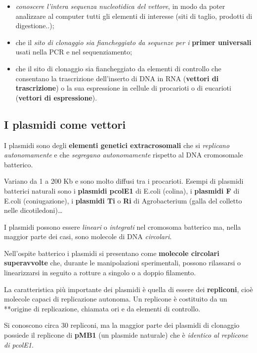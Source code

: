 \documentclass[11pt]{book}
\begin{document}
\begin{itemize}
\itemsep1pt\parskip0pt
\item
  \emph{conoscere l'intera sequenza nucleotidica del vettore}, in modo
  da poter analizzare al computer tutti gli elementi di interesse (siti
  di taglio, prodotti di digestione..);
\item
  che il \emph{sito di clonaggio sia fiancheggiato da sequenze per i}
  \textbf{primer universali} usati nella PCR e nel sequenziamento;
\item
  che il sito di clonaggio sia fiancheggiato da elementi di controllo
  che consentano la trascrizione dell'inserto di DNA in RNA
  (\textbf{vettori di trascrizione}) o la sua espressione in cellule di
  procarioti o di eucarioti (\textbf{vettori di espressione}).
\end{itemize}

\subsection{I plasmidi come vettori}\label{i-plasmidi-come-vettori}

I plasmidi sono degli \textbf{elementi genetici extracrosomali} che si
\emph{replicano autonomamente} e che \emph{segregano autonomamente}
rispetto al DNA cromosomale batterico.

Variano da 1 a 200 Kb e sono molto diffusi tra i procarioti. Esempi di
plasmidi batterici naturali sono i \textbf{plasmidi pcolE1} di E.coli
(colina), i \textbf{plasmidi F} di E.coli (coniugazione), i
\textbf{plasmidi Ti} o \textbf{Ri} di Agrobacterium (galla del colletto
nelle dicotiledoni)\ldots{}

I plasmidi possono essere \emph{lineari} o \emph{integrati} nel
cromosoma batterico ma, nella maggior parte dei casi, sono molecole di
DNA \emph{circolari}.

Nell'ospite batterico i plasmidi si presentano come \textbf{molecole
circolari superavvolte} che, durante le manipolazioni sperimentali,
possono rilassarsi o linearizzarsi in seguito a rotture a singolo o a
doppio filamento.

La caratteristica più importante dei plasmidi è quella di essere dei
\textbf{repliconi}, cioè molecole capaci di replicazione autonoma. Un
replicone è costituito da un **origine di replicazione, chiamata ori e
da elementi di controllo.

Si conoscono circa 30 repliconi, ma la maggior parte dei plasmidi di
clonaggio possiede il replicone di \textbf{pMB1} (un plasmide naturale)
che è \emph{identico al replicone di pcolE1}.
\end{document}
